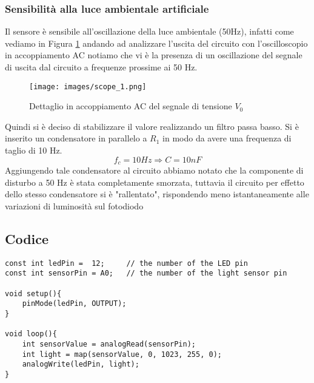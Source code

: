 \subsubsection{Sensibilità alla luce ambientale artificiale}
Il sensore è sensibile all'oscillazione della luce ambientale (50Hz), infatti come vediamo in Figura \ref{fig:scope_1} andando ad analizzare l'uscita del circuito con l'oscilloscopio in accoppiamento AC notiamo che vi è la presenza di un oscillazione del segnale di uscita dal circuito a frequenze prossime ai 50 Hz.
\begin{figure}[H]
    \centering
    \texttt{[image: images/scope\_1.png]}
    \caption{Dettaglio in accoppiamento AC del segnale di tensione $V_0$}
    \label{fig:scope_1}
\end{figure}
Quindi si è deciso di stabilizzare il valore realizzando un filtro passa basso. Si è inserito un condensatore in parallelo a $R_1$ in modo da avere una frequenza di taglio di 10 Hz. 
\begin{equation}
    f_c=10 Hz \Longrightarrow C = 10nF
\end{equation}
Aggiungendo tale condensatore al circuito abbiamo notato che la componente di disturbo a 50 Hz è stata completamente smorzata, tuttavia il circuito per effetto dello stesso condensatore si è "rallentato", rispondendo meno istantaneamente alle variazioni di luminosità sul fotodiodo
\subsection{Codice}
\begin{lstlisting}[frame=single, language=Arduino]
const int ledPin =  12;     // the number of the LED pin
const int sensorPin = A0;   // the number of the light sensor pin

void setup(){
    pinMode(ledPin, OUTPUT);
}

void loop(){
    int sensorValue = analogRead(sensorPin);
    int light = map(sensorValue, 0, 1023, 255, 0);
    analogWrite(ledPin, light);
}
\end{lstlisting}